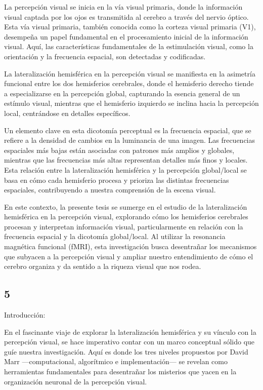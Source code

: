 \documentclass[12pt,oneside]{uhthesis}
\begin{document}
La percepción visual se inicia en la vía visual primaria, donde la información visual captada por los ojos es transmitida al cerebro a través del nervio óptico. Esta vía visual primaria, también conocida como la corteza visual primaria (V1), desempeña un papel fundamental en el procesamiento inicial de la información visual. Aquí, las características fundamentales de la estimulación visual, como la orientación y la frecuencia espacial, son detectadas y codificadas.

La lateralización hemisférica en la percepción visual se manifiesta en la asimetría funcional entre los dos hemisferios cerebrales, donde el hemisferio derecho tiende a especializarse en la percepción global, capturando la esencia general de un estímulo visual, mientras que el hemisferio izquierdo se inclina hacia la percepción local, centrándose en detalles específicos.

Un elemento clave en esta dicotomía perceptual es la frecuencia espacial, que se refiere a la densidad de cambios en la luminancia de una imagen. Las frecuencias espaciales más bajas están asociadas con patrones más amplios y globales, mientras que las frecuencias más altas representan detalles más finos y locales. Esta relación entre la lateralización hemisférica y la percepción global/local se basa en cómo cada hemisferio procesa y prioriza las distintas frecuencias espaciales, contribuyendo a nuestra comprensión de la escena visual.

En este contexto, la presente tesis se sumerge en el estudio de la lateralización hemisférica en la percepción visual, explorando cómo los hemisferios cerebrales procesan y interpretan información visual, particularmente en relación con la frecuencia espacial y la dicotomía global/local. Al utilizar la resonancia magnética funcional (fMRI), esta investigación busca desentrañar los mecanismos que subyacen a la percepción visual y ampliar nuestro entendimiento de cómo el cerebro organiza y da sentido a la riqueza visual que nos rodea.

\subsection{5}

Introducción:

En el fascinante viaje de explorar la lateralización hemisférica y su vínculo con la percepción visual, se hace imperativo contar con un marco conceptual sólido que guíe nuestra investigación. Aquí es donde los tres niveles propuestos por David Marr —computacional, algorítmico e implementación— se revelan como herramientas fundamentales para desentrañar los misterios que yacen en la organización neuronal de la percepción visual.
\end{document}
